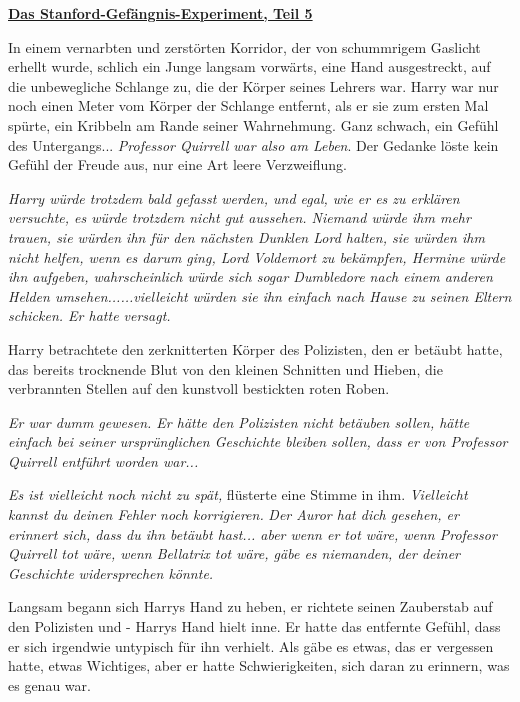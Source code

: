 

\hypertarget{das-stanford-gefuxe4ngnis-experiment-teil-5}{%

\textbf{\uline{Das Stanford-Gefängnis-Experiment, Teil 5}}

\hfill\break In einem vernarbten und zerstörten Korridor, der von schummrigem Gaslicht erhellt wurde, schlich ein Junge langsam vorwärts, eine Hand ausgestreckt, auf die unbewegliche Schlange zu, die der Körper seines Lehrers war. Harry war nur noch einen Meter vom Körper der Schlange entfernt, als er sie zum ersten Mal spürte, ein Kribbeln am Rande seiner Wahrnehmung. Ganz schwach, ein Gefühl des Untergangs... \emph{Professor Quirrell war also am Leben}. Der Gedanke löste kein Gefühl der Freude aus, nur eine Art leere Verzweiflung.

\emph{Harry würde trotzdem bald gefasst werden, und egal, wie er es zu erklären versuchte, es würde trotzdem nicht gut aussehen. Niemand würde ihm mehr trauen, sie würden ihn für den nächsten Dunklen Lord halten, sie würden ihm nicht helfen, wenn es darum ging, Lord Voldemort zu bekämpfen, Hermine würde ihn aufgeben, wahrscheinlich würde sich sogar Dumbledore nach einem anderen Helden umsehen......vielleicht würden sie ihn einfach nach Hause zu seinen Eltern schicken. Er hatte versagt.}

Harry betrachtete den zerknitterten Körper des Polizisten, den er betäubt hatte, das bereits trocknende Blut von den kleinen Schnitten und Hieben, die verbrannten Stellen auf den kunstvoll bestickten roten Roben.

\emph{Er war dumm gewesen. Er hätte den Polizisten nicht betäuben sollen, hätte einfach bei seiner ursprünglichen Geschichte bleiben sollen, dass er von Professor Quirrell entführt worden war...}

\emph{Es ist vielleicht noch nicht zu spät,} flüsterte eine Stimme in ihm. \emph{Vielleicht kannst du deinen Fehler noch korrigieren.} \emph{Der Auror hat dich gesehen, er erinnert sich, dass du ihn betäubt hast... aber wenn er tot wäre, wenn Professor Quirrell tot wäre, wenn Bellatrix tot wäre, gäbe es niemanden, der deiner Geschichte widersprechen könnte.}

Langsam begann sich Harrys Hand zu heben, er richtete seinen Zauberstab auf den Polizisten und - Harrys Hand hielt inne. Er hatte das entfernte Gefühl, dass er sich irgendwie untypisch für ihn verhielt. Als gäbe es etwas, das er vergessen hatte, etwas Wichtiges, aber er hatte Schwierigkeiten, sich daran zu erinnern, was es genau war.

}
